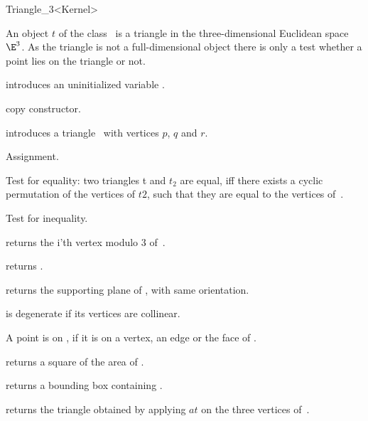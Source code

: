 \begin{ccRefClass} {Triangle_3<Kernel>}

\ccDefinition  An object $t$ of the class \ccRefName\ is a triangle in
the three-dimensional Euclidean space $\E^3$. As the triangle is not
a full-dimensional object there is only a test whether a point lies on
the triangle or not.
 
\ccCreation
{}

\ccHidden {}
             {introduces an uninitialized variable \ccVar.}

\ccHidden {}
 	    {copy constructor.}

            {introduces a triangle \ccVar\ with vertices $p$, $q$ and $r$.}

\ccOperations

\ccHidden {}
        {Assignment.}

       {Test for equality: two triangles t and $t_2$ are equal, iff there 
        exists a cyclic permutation of the vertices of $t2$, such that 
        they are equal to the vertices of~\ccVar.}

       {Test for inequality.}

       {returns the i'th vertex modulo 3  of~\ccVar.}

       {returns .}

       {returns the supporting plane of \ccVar, with same
       orientation.}

\ccPredicates

       {{\ccVar} is degenerate if its vertices are collinear.}

       {A point is on \ccVar, if it is on a vertex, an edge or the
        face of \ccVar.}


       {returns a square of the area of \ccVar.}

       {returns a bounding box containing \ccVar.}

       {returns the triangle obtained by applying $at$ on the three
        vertices of~\ccVar.}

\ccSeeAlso
{} \\

\end{ccRefClass} 
